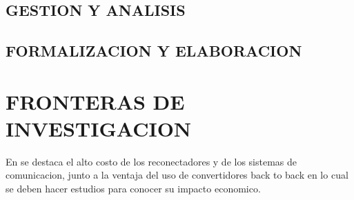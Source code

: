 \documentclass[12pt, letterpaper]{report}
\begin{document}
\section{GESTION Y ANALISIS}

\section{FORMALIZACION Y ELABORACION}




\chapter{FRONTERAS DE INVESTIGACION}
En \cite{Cao2016} se destaca el alto costo de los  reconectadores y de los sistemas de comunicacion, junto a la ventaja del uso de convertidores back to back en lo cual se deben hacer estudios para conocer su impacto economico.\\



%
\end{document}
